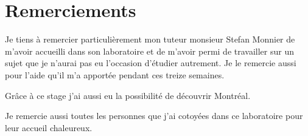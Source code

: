 \chapter*{Remerciements}
Je tiens à remercier particulièrement mon tuteur monsieur Stefan Monnier de m'avoir accueilli dans son laboratoire
et de m'avoir permi de travailler sur un sujet que je n'aurai pas eu l'occasion d'étudier autrement.
Je le remercie aussi pour l'aide qu'il m'a apportée pendant ces treize semaines.

Grâce à ce stage j'ai aussi eu la possibilité de découvrir Montréal.

Je remercie aussi toutes les personnes que j'ai cotoyées dans ce laboratoire pour leur accueil chaleureux.
